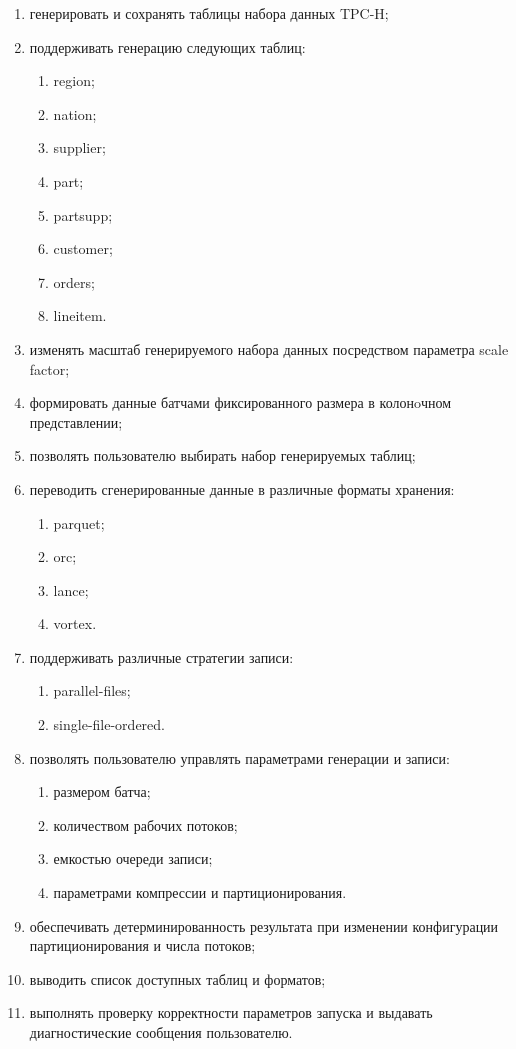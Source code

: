 \begin{enumerate}
    \item генерировать и сохранять таблицы набора данных TPC-H;
    \item поддерживать генерацию следующих таблиц:
    \begin{enumerate}
        \item region;
        \item nation;
        \item supplier;
        \item part;
        \item partsupp;
        \item customer;
        \item orders;
        \item lineitem.
    \end{enumerate}
    \item изменять масштаб генерируемого набора данных посредством параметра scale factor;
    \item формировать данные батчами фиксированного размера в колонoчном представлении;
    \item позволять пользователю выбирать набор генерируемых таблиц;
    \item переводить сгенерированные данные в различные форматы хранения:
    \begin{enumerate}
        \item parquet;
        \item orc;
        \item lance;
        \item vortex.
    \end{enumerate}
    \item поддерживать различные стратегии записи:
    \begin{enumerate}
        \item parallel-files;
        \item single-file-ordered.
    \end{enumerate}
    \item позволять пользователю управлять параметрами генерации и записи:
    \begin{enumerate}
        \item размером батча;
        \item количеством рабочих потоков;
        \item емкостью очереди записи;
        \item параметрами компрессии и партиционирования.
    \end{enumerate}
    \item обеспечивать детерминированность результата при изменении конфигурации партиционирования и числа потоков;
    \item выводить список доступных таблиц и форматов;
    \item выполнять проверку корректности параметров запуска и выдавать диагностические сообщения пользователю.
\end{enumerate}
